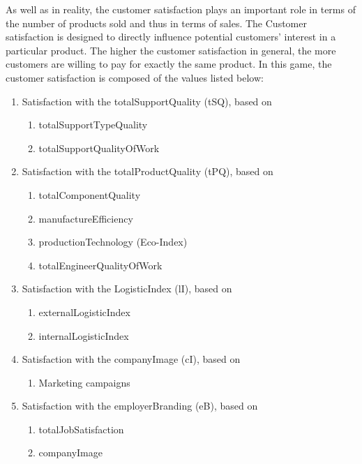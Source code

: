 As well as in reality, the customer satisfaction plays an important role in terms of the number of products sold and thus in terms of sales. %
The Customer satisfaction is designed to directly influence potential customers' interest in a particular product. The higher the customer satisfaction in general, the more customers are willing to pay for exactly the same product. 
In this game, the customer satisfaction is composed of the values listed below:
   \begin{enumerate}
      \item Satisfaction with the totalSupportQuality (tSQ), based on
      \begin{enumerate}
         \item totalSupportTypeQuality
         \item totalSupportQualityOfWork
      \end{enumerate}
      \item Satisfaction with the totalProductQuality (tPQ), based on
      \begin{enumerate}
         \item totalComponentQuality
         \item manufactureEfficiency
         \item productionTechnology (Eco-Index)
         \item totalEngineerQualityOfWork
      \end{enumerate}
      \item Satisfaction with the LogisticIndex (lI), based on
      \begin{enumerate}
         \item externalLogisticIndex
         \item internalLogisticIndex
      \end{enumerate}
      \item Satisfaction with the companyImage (cI), based on
      \begin{enumerate}
          \item Marketing campaigns
      \end{enumerate}
      \item Satisfaction with the employerBranding (eB), based on 
      \begin{enumerate}
          \item totalJobSatisfaction
          \item companyImage
      \end{enumerate}
   \end{enumerate}
